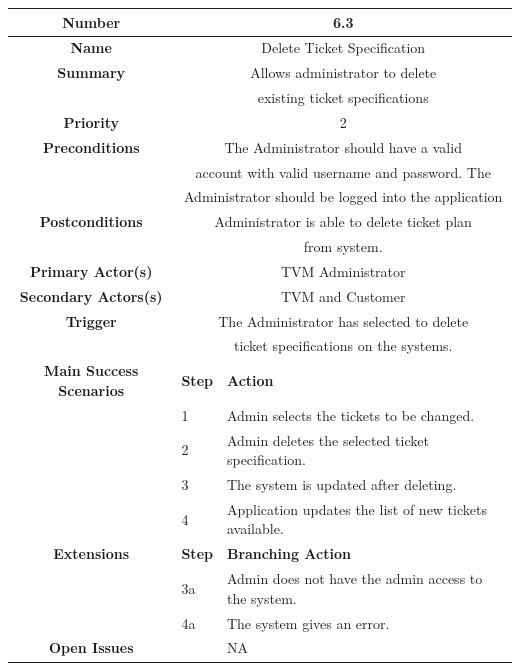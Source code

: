 \documentclass[a4paper,12pt]{report}
\begin{document}
\begin{tabular}{ | c | p{2cm} | p{7cm} |}
	
	\hline
	\textbf{Number} & \multicolumn{2}{c|}{6.3}  \\
	\hline
	\textbf{Name} & \multicolumn{2}{c|}{Delete Ticket Specification}  \\
	\hline
	\textbf{Summary} & \multicolumn{2}{c|}{Allows administrator to delete }  \\
					& \multicolumn{2}{c|}{existing ticket specifications}  \\
	\hline
	\textbf{Priority} & \multicolumn{2}{c|}{2}  \\
	\hline
	\textbf{Preconditions} & \multicolumn{2}{c|}{The Administrator should have a valid }  \\
	&  \multicolumn{2	}{c|}{account with valid username and password. The  } \\
	&  \multicolumn{2	}{c|}{Administrator should be logged into the application} \\
	\hline
	\textbf{Postconditions} & \multicolumn{2}{c|}{Administrator is able to delete ticket plan }  \\
	&  \multicolumn{2}{c|}{from system. } \\
	\hline
	\textbf{Primary Actor(s)} & \multicolumn{2}{c|}{TVM Administrator}  \\
	\hline
	\textbf{Secondary Actors(s)} & \multicolumn{2}{c|}{TVM and Customer}  \\
	\hline
	\textbf{Trigger} & \multicolumn{2}{c|}{The Administrator has selected to delete}  \\
	&  \multicolumn{2}{c|}{ ticket specifications on the systems.} \\
	\hline
	\textbf{Main Success Scenarios} & \textbf{Step} & \textbf{Action} \\
	\hline
	& 1 & Admin selects the tickets to be changed. \\ 
	\hline
	&  2  & Admin deletes the selected ticket specification. \\
	\hline
	&  3  & The system is updated after deleting. \\
	\hline
	&  4  & Application updates the list of new tickets available. \\
	\hline
	
	\textbf{Extensions} & \textbf{Step} & \textbf{Branching Action} \\
	\hline
	&  3a  & Admin does not have the admin access to the system.  \\
	\hline
	&  4a  &  The system gives an error. \\
	\hline
	\textbf{Open Issues} &    & NA \\
	\hline
	
\end{tabular}
\end{document}
